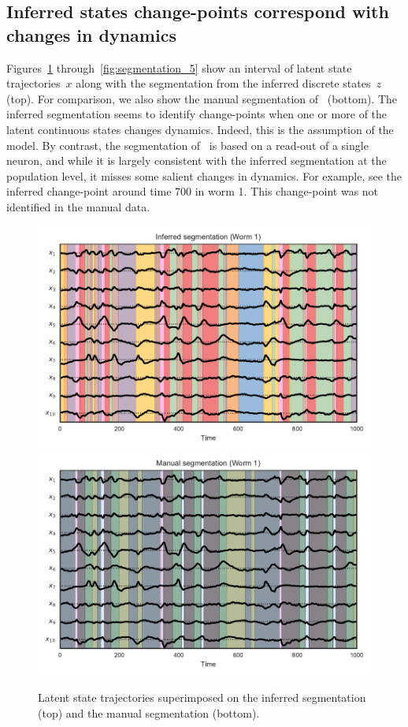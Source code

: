 \documentclass{article}
\begin{document}

\subsection{Inferred states change-points correspond with changes in dynamics}

Figures~\ref{fig:segmentation_1} through~\ref{fig:segmentation_5} show an
interval of latent state trajectories~$x$ along with the segmentation from
the inferred discrete states~$z$ (top).  For comparison, we also show the
manual segmentation of~\citep{kato2015global} (bottom).  The inferred
segmentation seems to identify change-points when one or more of the latent
continuous states changes dynamics.  Indeed, this is the assumption of the
model.  By contrast, the segmentation of~\citep{kato2015global} is based on
a read-out of a single neuron, and while it is largely consistent with the
inferred segmentation at the population level, it misses some salient
changes in dynamics.  For example, see the inferred change-point around
time 700 in worm 1.  This change-point was not identified in the manual
data.

\begin{figure}[h]
\centering%
\includegraphics[width=5.5in]{figures/arhmm/x_segmentation_0.pdf}
\includegraphics[width=5.5in]{figures/arhmm/x_segmentation_zimmer_0.pdf}
\caption{Latent state trajectories superimposed on the inferred segmentation (top)
  and the manual segmentation (bottom).}
\label{fig:segmentation_1}
\end{figure}
\end{document}
